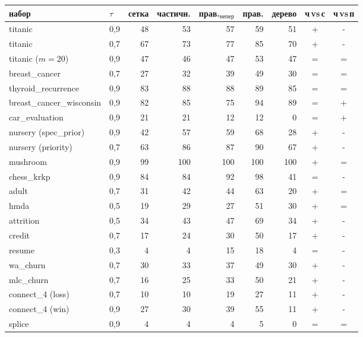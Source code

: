 \begin{tabular}{llrrrrrcc}
\toprule
набор & $\tau$ & сетка & частичн. & прав.$_{\mathrm{непер}}$ & прав. & дерево & ч$\,$vs$\,$с & ч$\,$vs$\,$п\\
\midrule
titanic & 0{,}9 & 48 & 53 & 57 & 59 & 51 & + & -\\
titanic & 0{,}7 & 67 & 73 & 77 & 85 & 70 & + & -\\
titanic ($m{=}20$) & 0{,}9 & 47 & 46 & 47 & 53 & 47 & = & =\\
breast\_cancer & 0{,}7 & 27 & 32 & 39 & 49 & 30 & = & =\\
thyroid\_recurrence & 0{,}9 & 83 & 88 & 88 & 89 & 85 & = & =\\
breast\_cancer\_wisconsin & 0{,}9 & 82 & 85 & 75 & 94 & 89 & = & +\\
car\_evaluation & 0{,}9 & 21 & 21 & 12 & 12 & 0 & = & +\\
nursery (spec\_prior) & 0{,}9 & 42 & 57 & 59 & 68 & 28 & + & -\\
nursery (priority) & 0{,}7 & 63 & 86 & 87 & 90 & 67 & + & -\\
mushroom & 0{,}9 & 99 & 100 & 100 & 100 & 100 & + & =\\
chess\_krkp & 0{,}9 & 84 & 84 & 92 & 98 & 41 & = & -\\
adult & 0{,}7 & 31 & 42 & 44 & 63 & 20 & + & =\\
hmda & 0{,}5 & 19 & 29 & 27 & 51 & 30 & + & =\\
attrition & 0{,}5 & 34 & 43 & 47 & 69 & 34 & + & -\\
credit & 0{,}7 & 17 & 24 & 30 & 50 & 17 & + & -\\
resume & 0{,}3 & 4 & 4 & 15 & 18 & 4 & = & -\\
wa\_churn & 0{,}7 & 30 & 33 & 37 & 49 & 30 & + & -\\
mlc\_churn & 0{,}7 & 16 & 25 & 33 & 50 & 21 & + & -\\
connect\_4 (loss) & 0{,}7 & 10 & 10 & 19 & 27 & 11 & + & -\\
connect\_4 (win) & 0{,}9 & 27 & 30 & 39 & 55 & 11 & + & -\\
splice & 0{,}9 & 4 & 4 & 4 & 5 & 0 & = & =\\
\bottomrule
\end{tabular}

